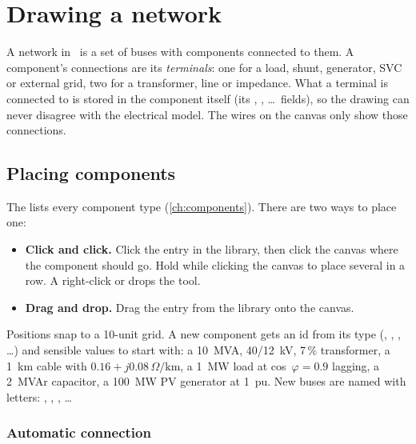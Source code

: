 \chapter{Drawing a network}\label{ch:drawing}

A network in \app\ is a set of buses with components connected to them. A component's
connections are its \emph{terminals}: one for a load, shunt, generator, SVC or external
grid, two for a transformer, line or impedance. What a terminal is connected to is stored
in the component itself (its , , \dots\ fields),
so the drawing can never disagree with the electrical model. The wires on the canvas only
show those connections.

\section{Placing components}\label{sec:placing}

\begin{minipage}[t]{0.6\linewidth}
The  lists every component type (\cref{ch:components}). There are two ways
to place one:

\begin{itemize}
  \item \textbf{Click and click.} Click the entry in the library, then click the canvas
    where the component should go. Hold \keys{\shift} while clicking the canvas to place
    several in a row. A right-click or  drops the tool.
  \item \textbf{Drag and drop.} Drag the entry from the library onto the canvas.
\end{itemize}

Positions snap to a 10-unit grid. A new component gets an id from its type (,
, , \dots) and sensible values to start with: a 10~MVA, 40/12~kV,
7\,\% transformer, a 1~km cable with $0.16+j0.08\,\Omega/\text{km}$, a 1~MW load at
cos~$\varphi=0.9$ lagging, a 2~MVAr capacitor, a 100~MW PV generator at 1~pu. New buses
are named with letters: , , , \dots
\end{minipage}\hfill
\begin{minipage}[t]{0.34\linewidth}\vspace{0pt}
  \centering{}
\end{minipage}

\subsection{Automatic connection}

